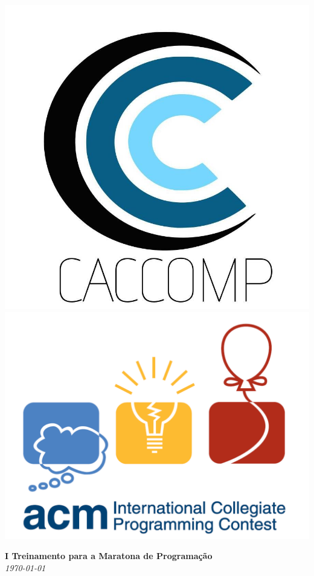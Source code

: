 \documentclass[11pt,oneside,a4paper]{book}
\begin{document}
\begin{titlepage}
\begin{center}
\includegraphics[scale=0.09]{logocaccomp.jpg}
\hspace{3em}
\includegraphics[scale=0.19]{logoacm.png}


\vspace{2em}
\large{\textbf{I Treinamento para a Maratona de Programação}} \\

\vspace{1em}
\textit{\today} \\


\end{center}
\end{titlepage}
\end{document}
